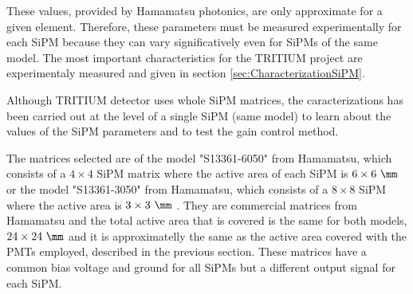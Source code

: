 These values, provided by Hamamatsu photonics, are only approximate for a given element. Therefore, these parameters must be measured experimentally for each SiPM because they can vary significatively even for SiPMs of the same model. The most important characteristics for the TRITIUM project are experimentaly measured and given in section \ref{sec:CharacterizationSiPM}. 

Although TRITIUM detector uses whole SiPM matrices, the caracterizations has been carried out at the level of a single SiPM (same model) to learn about the values of the SiPM parameters and to test the gain control method.
 
The matrices selected are of the model "S13361-6050" from Hamamatsu, which consists of a $4\times 4$ SiPM matrix where the active area of each SiPM is $6\times 6~\mm$ \cite{DataSheetHammamatsu_array_SiPM_6050} or the model "S13361-3050" from Hamamatsu, which consists of a $8\times 8$ SiPM where the active area is $3\times 3~\mm$ \cite{DataSheetHammamatsu_array_SiPM_3050}. They are commercial matrices from Hamamatsu and the total active area that is covered is the same for both models, $24\times 24~\mm$ and it is approximatelly the same as the active area covered with the PMTs employed, described in the previous section. These matrices have a common bias voltage and ground for all SiPMs but a different output signal for each SiPM. 

